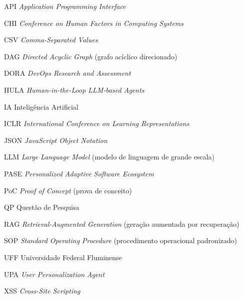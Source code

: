 \begin{siglas}
  \item[API] \textit{Application Programming Interface}
  \item[CHI] \textit{Conference on Human Factors in Computing Systems}
  \item[CSV] \textit{Comma-Separated Values}
  \item[DAG] \textit{Directed Acyclic Graph} (grafo acíclico direcionado)
  \item[DORA] \textit{DevOps Research and Assessment}
  \item[HULA] \textit{Human-in-the-Loop LLM-based Agents}
  \item[IA] Inteligência Artificial
  \item[ICLR] \textit{International Conference on Learning Representations}
  \item[JSON] \textit{JavaScript Object Notation}
  \item[LLM] \textit{Large Language Model} (modelo de linguagem de grande escala)
  \item[PASE] \textit{Personalized Adaptive Software Ecosystem}
  \item[PoC] \textit{Proof of Concept} (prova de conceito)
  \item[QP] Questão de Pesquisa
  \item[RAG] \textit{Retrieval-Augmented Generation} (geração aumentada por recuperação)
  \item[SOP] \textit{Standard Operating Procedure} (procedimento operacional padronizado)
  \item[UFF] Universidade Federal Fluminense
  \item[UPA] \textit{User Personalization Agent}
  \item[XSS] \textit{Cross-Site Scripting}
\end{siglas}
